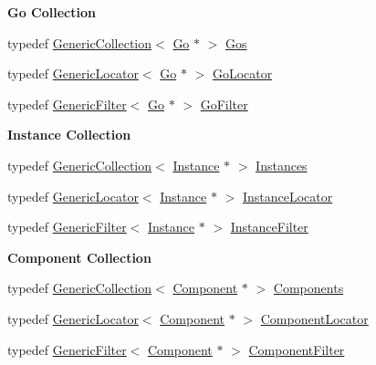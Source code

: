 \begin{Indent}\textbf{ Go Collection}\par
\begin{DoxyCompactItemize}
\item 
typedef \hyperlink{classHurricane_1_1GenericCollection}{Generic\+Collection}$<$ \hyperlink{classHurricane_1_1Go}{Go} $\ast$ $>$ \hyperlink{namespaceHurricane_a4456a34f3bc6766d471c3064ace19759}{Gos}
\item 
typedef \hyperlink{classHurricane_1_1GenericLocator}{Generic\+Locator}$<$ \hyperlink{classHurricane_1_1Go}{Go} $\ast$ $>$ \hyperlink{namespaceHurricane_ab7d66a25194b15d7646c93bcc1b15fc8}{Go\+Locator}
\item 
typedef \hyperlink{classHurricane_1_1GenericFilter}{Generic\+Filter}$<$ \hyperlink{classHurricane_1_1Go}{Go} $\ast$ $>$ \hyperlink{namespaceHurricane_a372aada7b76742fd900d0bb2c5398e0c}{Go\+Filter}
\end{DoxyCompactItemize}
\end{Indent}
\begin{Indent}\textbf{ Instance Collection}\par
\begin{DoxyCompactItemize}
\item 
typedef \hyperlink{classHurricane_1_1GenericCollection}{Generic\+Collection}$<$ \hyperlink{classHurricane_1_1Instance}{Instance} $\ast$ $>$ \hyperlink{namespaceHurricane_ac9436b03a2926f34ad6863deae2baadc}{Instances}
\item 
typedef \hyperlink{classHurricane_1_1GenericLocator}{Generic\+Locator}$<$ \hyperlink{classHurricane_1_1Instance}{Instance} $\ast$ $>$ \hyperlink{namespaceHurricane_af4f7fa4dc3a2d3bdcec6f375dc5a21bc}{Instance\+Locator}
\item 
typedef \hyperlink{classHurricane_1_1GenericFilter}{Generic\+Filter}$<$ \hyperlink{classHurricane_1_1Instance}{Instance} $\ast$ $>$ \hyperlink{namespaceHurricane_a889ec1441e1876d9addf89dfab32e772}{Instance\+Filter}
\end{DoxyCompactItemize}
\end{Indent}
\begin{Indent}\textbf{ Component Collection}\par
\begin{DoxyCompactItemize}
\item 
typedef \hyperlink{classHurricane_1_1GenericCollection}{Generic\+Collection}$<$ \hyperlink{classHurricane_1_1Component}{Component} $\ast$ $>$ \hyperlink{namespaceHurricane_a7d26d99aeb5dd6d70d51bd35d2473e72}{Components}
\item 
typedef \hyperlink{classHurricane_1_1GenericLocator}{Generic\+Locator}$<$ \hyperlink{classHurricane_1_1Component}{Component} $\ast$ $>$ \hyperlink{namespaceHurricane_ad72b1998a4ff6e68326469dec9887f4d}{Component\+Locator}
\item 
typedef \hyperlink{classHurricane_1_1GenericFilter}{Generic\+Filter}$<$ \hyperlink{classHurricane_1_1Component}{Component} $\ast$ $>$ \hyperlink{namespaceHurricane_acbfacb3aada84aa054e587817f204e90}{Component\+Filter}
\end{DoxyCompactItemize}
\end{Indent}
